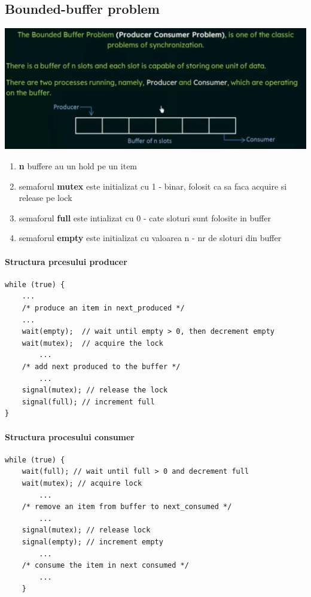 \documentclass{article}
\begin{document}
\subsection*{Bounded-buffer problem}
\begin{center}
    \includegraphics[scale=0.3]{17_boundedbuffer.png}
\end{center}
\begin{enumerate}
    \item \textbf{n} buffere au un hold pe un item
    \item semaforul \textbf{mutex} este initializat cu 1 - binar, folosit ca sa faca acquire si release pe lock
    \item semaforul \textbf{full} este intializat cu 0 - cate sloturi sunt folosite in buffer
    \item semaforul \textbf{empty} este initializat cu valoarea n - nr de sloturi din buffer
\end{enumerate}
\paragraph*{Structura prcesului producer}
\begin{center}
    \begin{lstlisting}
while (true) { 
    ...
    /* produce an item in next_produced */ 
    ... 
    wait(empty);  // wait until empty > 0, then decrement empty
    wait(mutex);  // acquire the lock
        ...
    /* add next produced to the buffer */ 
        ... 
    signal(mutex); // release the lock
    signal(full); // increment full
}
    \end{lstlisting}
\end{center}
\paragraph*{Structura procesului consumer}
\begin{center}
    \begin{lstlisting}
while (true) { 
    wait(full); // wait until full > 0 and decrement full
    wait(mutex); // acquire lock
        ...
    /* remove an item from buffer to next_consumed */ 
        ... 
    signal(mutex); // release lock
    signal(empty); // increment empty
        ...
    /* consume the item in next consumed */ 
        ...
    }
    \end{lstlisting}
\end{center}
\end{document}
